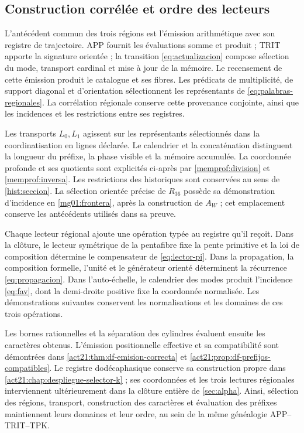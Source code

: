 \subsection{Construction corrélée et ordre des lecteurs}
\label{gen:orden-constructor-correlacionado}

L'antécédent commun des trois régions est l'émission arithmétique avec son registre de trajectoire. APP fournit les évaluations somme et produit ; TRIT apporte la signature orientée ; la transition \eqref{eq:actualizacion} compose sélection du mode, transport cardinal et mise à jour de la mémoire. Le recensement de cette émission produit le catalogue et ses fibres. Les prédicats de multiplicité, de support diagonal et d'orientation sélectionnent les représentants de \eqref{eq:palabras-regionales}. La corrélation régionale conserve cette provenance conjointe, ainsi que les incidences et les restrictions entre ses registres.

Les transports \(L_0,L_1\) agissent sur les représentants sélectionnés
dans la coordinatisation en lignes déclarée. Le calendrier et la concaténation distinguent
la longueur du préfixe, la phase visible et la mémoire accumulée. La
coordonnée profonde et ses quotients sont explicités ci-après par
\eqref{memprof:division} et \eqref{memprof:inversa}. Les restrictions des
historiques sont conservées au sens de \ref{hist:seccion}.
La sélection orientée précise de \(R_{36}\) possède sa démonstration
d'incidence en \ref{mg01:frontera}, après la construction de \(A_W\) ;
cet emplacement conserve les antécédents utilisés dans sa preuve.

Chaque lecteur régional ajoute une opération typée au registre qu'il reçoit.
Dans la clôture, le lecteur symétrique de la pentafibre fixe la pente
primitive et la loi de composition détermine le compensateur de
\eqref{eq:lector-pi}. Dans la propagation, la composition formelle, l'unité
et le générateur orienté déterminent la récurrence
\eqref{eq:propagacion}. Dans l'auto-échelle, le calendrier des modes produit
l'incidence \eqref{eq:fav}, dont la demi-droite positive fixe la coordonnée
normalisée. Les démonstrations suivantes conservent les normalisations
et les domaines de ces trois opérations.

Les bornes rationnelles et la séparation des cylindres évaluent ensuite les caractères obtenus. L'émission positionnelle effective et sa compatibilité sont démontrées dans \ref{act21:thm:df-emision-correcta} et \ref{act21:prop:df-prefijos-compatibles}. Le registre dodécaphasique conserve sa construction propre dans \ref{act21:chap:despliegue-selector-k} ; ses coordonnées et les trois lectures régionales interviennent ultérieurement dans la clôture entière de \ref{sec:alpha}. Ainsi, sélection des régions, transport, construction des caractères et évaluation des préfixes maintiennent leurs domaines et leur ordre, au sein de la même généalogie APP--TRIT--TPK.

